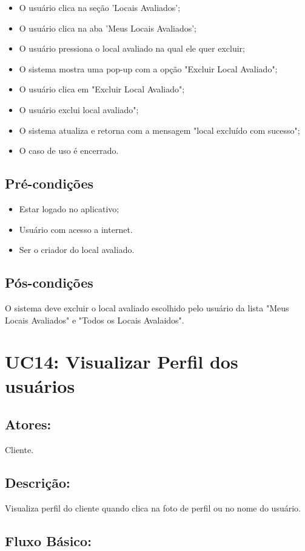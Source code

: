 \begin{itemize}
    \item O usuário clica na seção 'Locais Avaliados';
    \item O usuário clica na aba 'Meus Locais Avaliados';
    \item O usuário pressiona o local avaliado na qual ele quer excluir;
    \item O sistema mostra uma pop-up com a opção "Excluir Local Avaliado"; 
    \item O usuário clica em "Excluir Local Avaliado";
    \item O usuário exclui local avaliado";
    \item O sistema atualiza e retorna com a mensagem "local excluído com sucesso";
    \item O caso de uso é encerrado. 
\end{itemize}
\subsection{Pré-condições}
\begin{itemize}
    \item Estar logado no aplicativo;
    \item Usuário com acesso a internet. 
    \item Ser o criador do local avaliado. 
\end{itemize}

\subsection{Pós-condições}
O sistema deve excluir o local avaliado escolhido pelo usuário da lista "Meus Locais Avaliados" e "Todos os Locais Avalaidos".

\section{UC14: Visualizar Perfil dos usuários}

\subsection{Atores:}
Cliente. 
\subsection{Descrição:}
Visualiza perfil do cliente quando clica na foto de perfil ou no nome do usuário.
\subsection{Fluxo Básico:}

